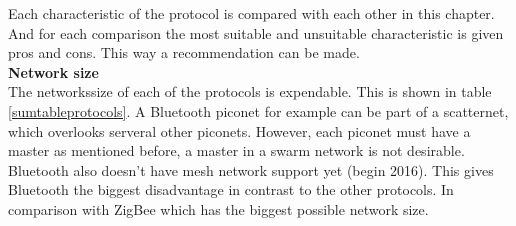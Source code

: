\documentclass[10pt,a4paper]{article}
\begin{document}
\begin{table}[H]
\centering
\caption{A table with a summerazing of the protocols. The table is based on information from \cite{comparitivestudywirelessprotocols}. Infrared is not included due to the line of sight problem.}
\label{sumtableprotocols}
\end{table}

Each characteristic of the protocol is compared with each other in this chapter. And for each comparison the most suitable and unsuitable characteristic is given pros and cons. This way a recommendation can be made.\\

\textbf{Network size}\\
The networkssize of each of the protocols is expendable. This is shown in table \ref{sumtableprotocols}. A Bluetooth piconet for example can be part of a scatternet, which overlooks serveral other piconets. However, each piconet must have a master as mentioned before, a master in a swarm network is not desirable. Bluetooth also doesn't have mesh network support yet (begin 2016). \cite{bluetoothmesh} This gives Bluetooth the biggest disadvantage in contrast to the other protocols. In comparison with ZigBee which has the biggest possible network size.\\
\end{document}
